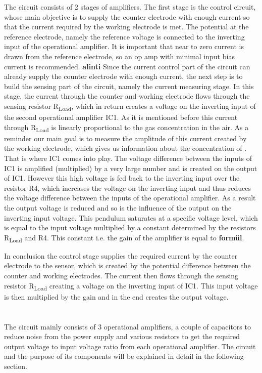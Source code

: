 The circuit consists of 2 stages of amplifiers. The first stage is the control circuit, whose main objective is to supply the counter electrode with enough current so that the current required by the working electrode is met. The potential at the reference electrode, namely the reference voltage is connected to the inverting input of the operational amplifier. It is important that near to zero current is drawn from the reference electrode, so an op amp with minimal input bias current is recommended. \textbf{alinti}
Since the current control part of the circuit can already supply the counter electrode with enough current, the next step is to build the sensing part of the circuit, namely the current measuring stage. In this stage, the current through the counter and working electrode flows through the sensing resistor R\textsubscript{Load}, which in return creates a voltage on the inverting input of the second operational amplifier IC1. As it is mentioned before this current through R\textsubscript{Load} is linearly proportional to the gas concentration in the air. As a reminder our main goal is to measure the amplitude of this current created by the working electrode, which gives us information about the concentration of . That is where IC1 comes into play. The voltage difference between the inputs of IC1 is amplified (multiplied) by a very large number and is created on the output of IC1. However this high voltage is fed back to the inverting input over the resistor R4, which increases the voltage on the inverting input and thus reduces the voltage difference between the inputs of the operational amplifier. As a result the output voltage is reduced and so is the influence of the output on the inverting input voltage. This pendulum saturates at a specific voltage level, which is equal to the input voltage multiplied by a constant determined by the resistors R\textsubscript{Load} and R4. This constant i.e. the gain of the amplifier is equal to \textbf{formül}. \par
In conclusion the control stage supplies the required current by the counter electrode to the sensor, which is created by the potential difference between the counter and working electrodes. The current then flows through the sensing resistor  R\textsubscript{Load} creating a voltage on the inverting input of IC1. This input voltage is then multiplied by the gain and in the end creates the output voltage.\par 









 

\section{}
The circuit mainly consists of 3 operational amplifiers, a couple of capacitors to reduce noise from the power supply and various resistors to get the required output voltage to input voltage ratio from each operational amplifier. The circuit and the purpose of its components will be explained in detail in the following section. 


